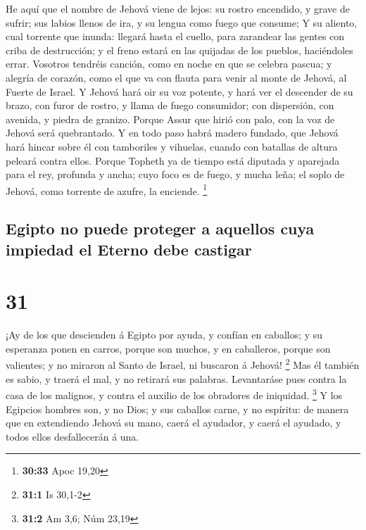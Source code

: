  He aquí que el nombre de Jehová viene de lejos: su
rostro encendido, y grave de sufrir; sus labios llenos de ira, y su
lengua como fuego que consume;  Y su aliento, cual
torrente que inunda: llegará hasta el cuello, para zarandear las gentes
con criba de destrucción; y el freno estará en las quijadas de los
pueblos, haciéndoles errar.  Vosotros tendréis canción,
como en noche en que se celebra pascua; y alegría de corazón, como el
que va con flauta para venir al monte de Jehová, al Fuerte de Israel.
 Y Jehová hará oir su voz potente, y hará ver el
descender de su brazo, con furor de rostro, y llama de fuego consumidor;
con dispersión, con avenida, y piedra de granizo.  Porque
Assur que hirió con palo, con la voz de Jehová será quebrantado.
 Y en todo paso habrá madero fundado, que Jehová hará
hincar sobre él con tamboriles y vihuelas, cuando con batallas de altura
peleará contra ellos.  Porque Topheth ya de tiempo está
diputada y aparejada para el rey, profunda y ancha; cuyo foco es de
fuego, y mucha leña; el soplo de Jehová, como torrente de azufre, la
enciende. \footnote{\textbf{30:33} Apoc 19,20}

\hypertarget{egipto-no-puede-proteger-a-aquellos-cuya-impiedad-el-eterno-debe-castigar}{%
\subsection{Egipto no puede proteger a aquellos cuya impiedad el Eterno
debe
castigar}\label{egipto-no-puede-proteger-a-aquellos-cuya-impiedad-el-eterno-debe-castigar}}

\hypertarget{section-30}{%
\section{31}\label{section-30}}

 ¡Ay de los que descienden á Egipto por ayuda, y confían
en caballos; y su esperanza ponen en carros, porque son muchos, y en
caballeros, porque son valientes; y no miraron al Santo de Israel, ni
buscaron á Jehová! \footnote{\textbf{31:1} Is 30,1-2}  Mas
él también es sabio, y traerá el mal, y no retirará sus palabras.
Levantaráse pues contra la casa de los malignos, y contra el auxilio de
los obradores de iniquidad. \footnote{\textbf{31:2} Am 3,6; Núm 23,19}
 Y los Egipcios hombres son, y no Dios; y sus caballos
carne, y no espíritu: de manera que en extendiendo Jehová su mano, caerá
el ayudador, y caerá el ayudado, y todos ellos desfallecerán á una.

